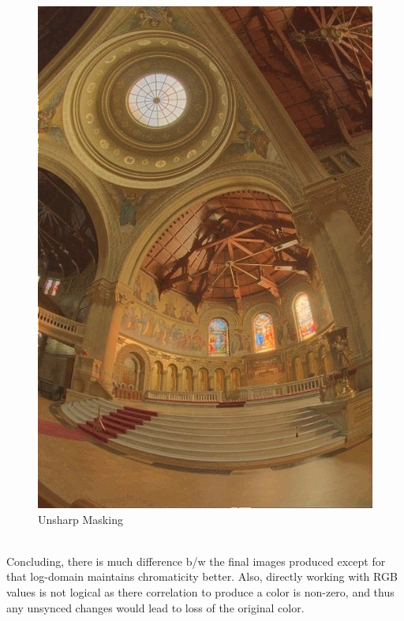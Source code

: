 \documentclass{article}
\begin{document}
\begin{figure}[!htb]
      \includegraphics[scale=.27]{./data/2/lg/s3.jpg}
      \caption{Unsharp Masking}
    \endminipage
    \end{figure}
    \\
    Concluding, there is much difference b/w the final images produced except for that log-domain maintains chromaticity better. Also, directly working with RGB values is not logical as there correlation to produce a color is non-zero, and thus any unsynced changes would lead to loss of the original color.
    
    \pagebreak
    
\end{document}
